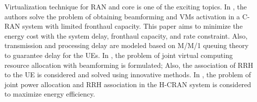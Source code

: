 \documentclass[conference]{IEEEtran}
\begin{document}
Virtualization technique for RAN and core is one of the exciting topics.  
In \cite{SystemCostMinimization,guo2016exploiting}, the authors solve the problem of obtaining beamforming and VMs activation in a C-RAN system with limited fronthaul capacity. 
This paper aims to minimize the energy cost with the system delay, fronthaul capacity, and rate constraint. 
Also, transmission and processing delay are modeled based on M/M/1 queuing theory to guarantee delay for the UEs.
 In \cite{luong2018joint,luong2018novel}, the problem of joint virtual computing resource allocation with beamforming is formulated; Also, the association of RRH to the UE is considered and solved using innovative methods.
In \cite{ali2019energy,ali2019energy1,ali2018joint}, the problem of joint power allocation and RRH association in the H-CRAN system is considered to maximize energy efficiency.
\end{document}
